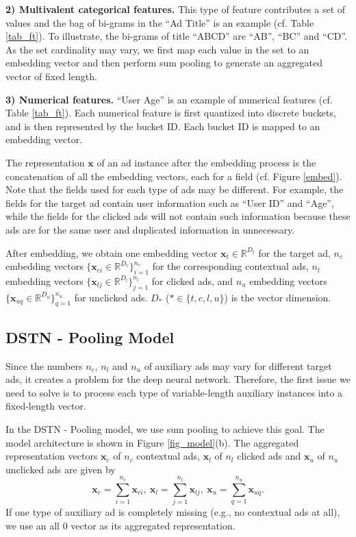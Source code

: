 \documentclass[sigconf]{acmart}
\begin{document}
\textbf{2) Multivalent categorical features.} This type of feature contributes a set of values and the bag of bi-grams in the ``Ad Title'' is an example (cf. Table \ref{tab_ft}). To illustrate, the bi-grams of title ``ABCD'' are ``AB'', ``BC'' and ``CD''.
As the set cardinality may vary, we first map each value in the set to an embedding vector and then perform sum pooling to generate an aggregated vector of fixed length.

\textbf{3) Numerical features.} ``User Age'' is an example of numerical features (cf. Table \ref{tab_ft}). Each numerical feature is first quantized into discrete buckets, and is then represented by the bucket ID. Each bucket ID is mapped to an embedding vector.

The representation $\mathbf{x}$ of an ad instance after the embedding process is the concatenation of all the embedding vectors, each for a field (cf. Figure \ref{embed}).
Note that the fields used for each type of ads may be different. For example, the fields for the target ad contain user information such as ``User ID'' and ``Age'', while the fields for the clicked ads will not contain such information because these ads are for the same user and duplicated information in unnecessary.

After embedding, we obtain one embedding vector $\mathbf{x}_t \in \mathbb{R}^{D_t}$ for the target ad, $n_c$ embedding vectors $\{\mathbf{x}_{ci} \in \mathbb{R}^{D_c} \}_{i=1}^{n_c}$ for the corresponding contextual ads, $n_l$ embedding vectors $\{\mathbf{x}_{lj} \in \mathbb{R}^{D_l}\}_{j=1}^{n_l}$ for clicked ads, and $n_u$ embedding vectors $\{\mathbf{x}_{uq} \in \mathbb{R}^{D_u}\}_{q=1}^{n_u}$ for unclicked ads. $D_\ast$ ($\ast \in \{t, c, l, u\}$) is the vector dimension.


\subsection{DSTN - Pooling Model} \label{sec_base}
Since the numbers $n_c$, $n_l$ and $n_u$ of auxiliary ads may vary for different target ads, it creates a problem for the deep neural network. Therefore, the first issue we need to solve is to process each type of variable-length auxiliary instances into a fixed-length vector.

In the DSTN - Pooling model, we use sum pooling to achieve this goal. The model architecture is shown in Figure \ref{fig_model}(b). The aggregated representation vectors $\mathbf{x}_c$ of $n_c$ contextual ads, $\mathbf{x}_l$ of $n_l$ clicked ads and $\mathbf{x}_u$ of $n_u$ unclicked ads are given by
\[
\mathbf{x}_c = \sum_{i=1}^{n_c} \mathbf{x}_{ci}, \ \mathbf{x}_l = \sum_{j=1}^{n_l} \mathbf{x}_{lj}, \ \mathbf{x}_u = \sum_{q=1}^{n_u} \mathbf{x}_{uq}.
\]
If one type of auxiliary ad is completely missing (e.g., no contextual ads at all), we use an all 0 vector as its aggregated representation.
\end{document}
